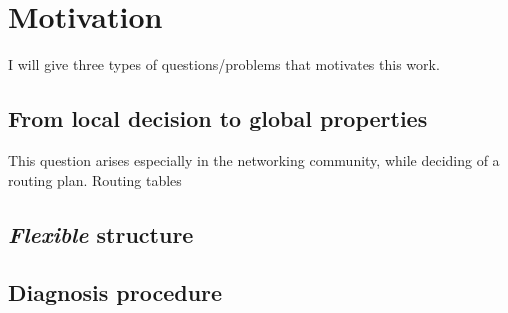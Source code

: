 \section*{Motivation}
I will give three types of questions/problems that motivates this work.

\subsection*{From local decision to global properties}
This question arises especially in the networking community, while deciding of a routing plan. Routing tables 

\subsection*{\textit{Flexible} structure}


\subsection*{Diagnosis procedure}